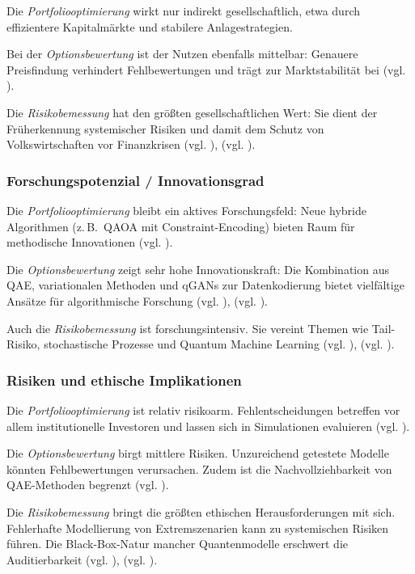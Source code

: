 Die \textit{Portfoliooptimierung} wirkt nur indirekt gesellschaftlich, etwa durch effizientere Kapitalmärkte und stabilere Anlagestrategien.

Bei der \textit{Optionsbewertung} ist der Nutzen ebenfalls mittelbar: Genauere Preisfindung verhindert Fehlbewertungen und trägt zur Marktstabilität bei (vgl. \cite{stamatopoulos_option_2020}).

Die \textit{Risikobemessung} hat den größten gesellschaftlichen Wert: Sie dient der Früherkennung systemischer Risiken und damit dem Schutz von Volkswirtschaften vor Finanzkrisen (vgl. \cite{orus_quantum_2019}), (vgl. \cite{zoufal_quantum_2019}).

\subsubsection*{Forschungspotenzial / Innovationsgrad}

Die \textit{Portfoliooptimierung} bleibt ein aktives Forschungsfeld: Neue hybride Algorithmen (z.\,B.\ QAOA mit Constraint-Encoding) bieten Raum für methodische Innovationen (vgl. \cite{buonaiuto_best_2023}).

Die \textit{Optionsbewertung} zeigt sehr hohe Innovationskraft: Die Kombination aus QAE, variationalen Methoden und qGANs zur Datenkodierung bietet vielfältige Ansätze für algorithmische Forschung (vgl. \cite{zoufal_quantum_2019}), (vgl. \cite{stamatopoulos_option_2020}).

Auch die \textit{Risikobemessung} ist forschungsintensiv. Sie vereint Themen wie Tail-Risiko, stochastische Prozesse und Quantum Machine Learning (vgl. \cite{egger_quantum_2020}), (vgl. \cite{martin2022}).

\subsubsection*{Risiken und ethische Implikationen}

Die \textit{Portfoliooptimierung} ist relativ risikoarm. Fehlentscheidungen betreffen vor allem institutionelle Investoren und lassen sich in Simulationen evaluieren (vgl. \cite{sakuler_real-world_2025}).

Die \textit{Optionsbewertung} birgt mittlere Risiken. Unzureichend getestete Modelle könnten Fehlbewertungen verursachen. Zudem ist die Nachvollziehbarkeit von QAE-Methoden begrenzt (vgl. \cite{stamatopoulos_option_2020}).

Die \textit{Risikobemessung} bringt die größten ethischen Herausforderungen mit sich. Fehlerhafte Modellierung von Extremszenarien kann zu systemischen Risiken führen. Die Black-Box-Natur mancher Quantenmodelle erschwert die Auditierbarkeit (vgl. \cite{orus_quantum_2019}), (vgl. \cite{zoufal_quantum_2019}).

